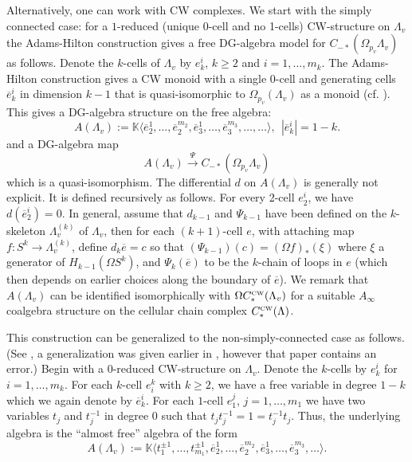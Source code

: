 \documentclass{gtpart}
\begin{document}
Alternatively, one can work with CW complexes. We start with the simply connected case: for a
$1$-reduced (unique 0-cell and no 1-cells) CW-structure on $\Lambda_v$ the Adams-Hilton construction
\cite{AH} gives a free DG-algebra model for $C_{-*}(\Omega_{p_v} \Lambda_v)$ as follows. Denote the
$k$-cells of $\Lambda_{v}$ by $e_k^i$, $k\geq 2$ and $i=1,\ldots,m_{k}$. The Adams-Hilton
construction gives a CW monoid with a single 0-cell and generating cells $\overline{e}_k^i$ in
dimension $k-1$ that is quasi-isomorphic to $\Omega_{p_v}(\Lambda_v)$ as a monoid (cf. \cite{CM}). This gives a DG-algebra structure on the free algebra:
\[ 
A(\Lambda_v) := \mathbb{K} \langle \overline{e}_2^1,\ldots,\overline{e}_{2}^{m_{2}},
\overline{e}_3^1,\ldots,\overline{e}_3^{m_{3}}, \ldots,
\ldots  \rangle , \ \ |\overline{e}_k^i| = 1-k. 
\] 
and a DG-algebra map 
\[ A(\Lambda_v) \xrightarrow{\Psi} C_{-*}(\Omega_{p_v}\Lambda_v) \]  
which is a quasi-isomorphism. The differential $d$ on $A(\Lambda_{v})$ is generally not explicit. It  is defined recursively as follows. For every 2-cell $e_{2}^{i}$, we have $d(\overline{e}_{2}^{i}) = 0$. In general, assume
that $d_{k-1}$ and $\Psi_{k-1}$ have been defined on
the $k$-skeleton $\Lambda_v^{(k)}$ of $\Lambda_{v}$, then for each $(k+1)$-cell $e$, with attaching map $f\colon S^{k} \to
\Lambda_v^{(k)}$, define $d_{k} \overline{e} = c$ so that $(\Psi_{k-1})(c) = (\Omega f)_* (\xi)$
where $\xi$ a generator of $H_{k-1}(\Omega S^{k})$, and $\Psi_{k}(\overline{e})$ to be the $k$-chain
of loops in $e$ (which then depends on earlier choices along the boundary of $\overline{e}$).
We remark that $A(\Lambda_v)$ can be identified isomorphically with $\Omega C_*^{\text{\tiny
CW}}(\Lambda_v)$ for a suitable
$A_\infty$ coalgebra structure on the cellular chain complex $C_*^{\text{\tiny CW}}(\Lambda)$.

This construction can be generalized to the
non-simply-connected case as follows. (See \cite{holstein, holstein2}, a generalization was given earlier in \cite{FT}, however that paper contains an error.) Begin with a $0$-reduced
CW-structure on $\Lambda_v$. Denote the $k$-cells by $e_{k}^{i}$ for
$i=1,\ldots, m_{k}$. For each $k$-cell $e^k_i$ with $k\geq 2$, we have a free
variable in degree $1-k$ which we again denote by $\overline{e}_k^i$. For each $1$-cell $e_1^j$, $j=1,\dots,m_{1}$ we have two variables $t_j$ and $t_j^{-1}$ in degree 0 such that $t_j t^{-1}_j = 1 = t^{-1}_j t_j$. Thus, the underlying
algebra is the ``almost free'' algebra of the form
\[ A(\Lambda_v) := \mathbb{K} \langle t_1^{\pm 1},\ldots, t_{m_{1}}^{\pm 1},
\overline{e}_2^1,\ldots,\overline{e}_2^{m_{2}},\overline{e}_{3}^{1},\ldots,\overline{e}_{3}^{m_{3}}, \ldots\rangle.
\] 
\end{document}
